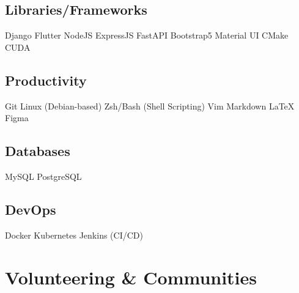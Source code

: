 \documentclass[]{openfont}
\begin{document}
\begin{minipage}[t]{0.33\textwidth}
    \subsection{Libraries/Frameworks}
    Django \textbullet{} Flutter \textbullet{} NodeJS \textbullet{} ExpressJS \textbullet{} FastAPI \textbullet{} Bootstrap5 \textbullet{} Material UI \textbullet{} CMake \textbullet{} CUDA
    \sectionsep

    \subsection{Productivity}
    Git \textbullet{} Linux (Debian-based) \textbullet{} Zsh/Bash (Shell Scripting) \textbullet{} Vim \textbullet{} Markdown \textbullet{} LaTeX \textbullet{} Figma
    \sectionsep

    \subsection{Databases}
    MySQL \textbullet{} PostgreSQL
    \sectionsep

    \subsection{DevOps}
    Docker \textbullet{} Kubernetes \textbullet{} Jenkins (CI/CD)
    \sectionsep

    \section{Volunteering \& Communities}

    \textbullet{} 

    \textbullet{} 

    \textbullet{} 

    \textbullet{} 



\end{minipage}
\end{document}
